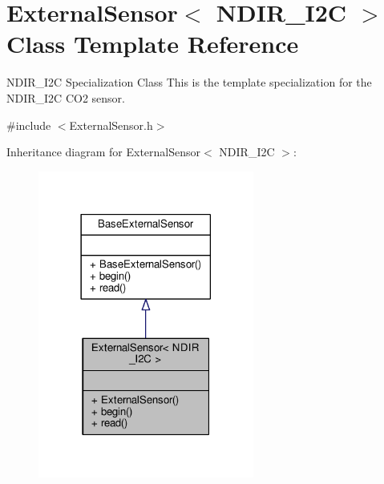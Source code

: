 \hypertarget{class_external_sensor_3_01_n_d_i_r___i2_c_01_4}{}\section{External\+Sensor$<$ N\+D\+I\+R\+\_\+\+I2C $>$ Class Template Reference}
\label{class_external_sensor_3_01_n_d_i_r___i2_c_01_4}


N\+D\+I\+R\+\_\+\+I2C Specialization Class This is the template specialization for the N\+D\+I\+R\+\_\+\+I2C C\+O2 sensor.  




{\ttfamily \#include $<$External\+Sensor.\+h$>$}



Inheritance diagram for External\+Sensor$<$ N\+D\+I\+R\+\_\+\+I2C $>$\+:
\nopagebreak
\begin{figure}[H]
\begin{center}
\leavevmode
\includegraphics[width=201pt]{d0/d1b/class_external_sensor_3_01_n_d_i_r___i2_c_01_4__inherit__graph}
\end{center}
\end{figure}



